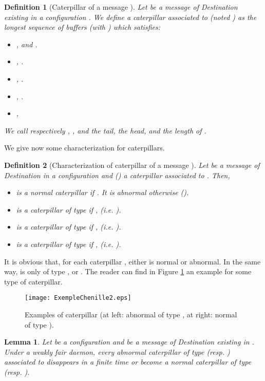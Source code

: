 \documentclass[11pt]{article}
\newtheorem{definition}{Definition}
\newtheorem{lemma}{Lemma}
\begin{document}
\begin{definition} [Caterpillar of a message ] 
Let  be a message of Destination  existing in a configuration . We define a caterpillar associated to  (noted ) as the longest sequence of buffers  (with ) which satisfies:
\begin{itemize}
\item ,  and .
\item , .
\item , .
\item , .
\item , 
\end{itemize}
We call respectively , , and  the tail, the head, and the length of .
\end{definition}

We give now some characterization for caterpillars.

\begin{definition} [Characterization of caterpillar of a message ]
Let  be a message of Destination  in a configuration  and  () a caterpillar associated to . Then,
\begin{itemize}
\item  is a normal caterpillar if . It is abnormal otherwise ().
\item  is a caterpillar of type  if ,  (\emph{i.e.} ).
\item  is a caterpillar of type  if ,  (\emph{i.e.} ).
\item  is a caterpillar of type  if ,  (\emph{i.e.} ).
\end{itemize}
\end{definition}

It is obvious that, for each caterpillar , either  is normal or abnormal. In the same way,  is only of type ,  or . The reader can find in Figure \ref{fig:CaterpillarD} an example for some type of caterpillar. 

\begin{figure}
\begin{centering}
\texttt{[image: ExempleChenille2.eps]}
\par\end{centering}
\caption{\label{fig:CaterpillarD}Examples of caterpillar (at left: abnormal of type , at right: normal of type ).}
\end{figure}

\begin{lemma} \label{lem:prelem1}
Let  be a configuration and  be a message of Destination  existing in . Under a weakly fair daemon, every abnormal caterpillar of type  (resp. ) associated to  disappears in a finite time or become a normal caterpillar of type  (resp. ).
\end{lemma}
\end{document}

